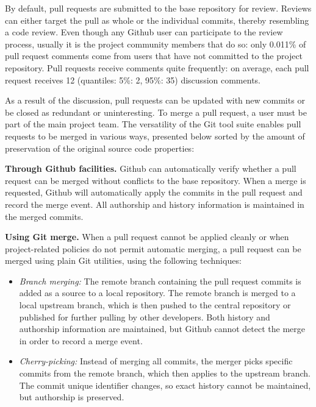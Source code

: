 \documentclass{acm_proc_article-sp}
\begin{document}
By default, pull requests are submitted to the base repository for review.
Reviews can either target the pull as whole or the individual commits,
thereby resembling a code review. 
Even though any Github user can participate to the
review process, usually it is the project community members that do so:
only 0.011\% of pull request comments come from users that have not
committed to the project repository.
Pull requests receive comments quite frequently: on average, each pull
request receives 12 (quantiles: 5\%: 2, 95\%: 35) discussion comments.

As a result of the discussion, pull requests can be updated with new commits or
be closed as redundant or uninteresting. To merge a pull request, a user must
be part of the main project team. The versatility of the Git tool suite enables
pull requests to be merged in various ways, presented below sorted by
the amount of preservation of the original source code properties:


\textbf{Through Github facilities.}
    Github can automatically verify whether a
    pull request can be merged without conflicts to the base repository. When a
    merge is requested, Github will automatically apply the commits in the pull
    request and record the merge event. All authorship and history information
    is maintained in the merged commits.

    
    \textbf{Using Git merge.} When a pull request cannot be applied cleanly or when
    project-related policies do not permit automatic merging, a pull request
    can be merged using plain Git utilities, using the following
    techniques: 

    \begin{itemize}

      \item \emph{Branch merging:} The remote branch containing the pull
        request commits is added as a source to a local repository. The remote 
        branch is merged to a local upstream branch, which is then pushed to
        the central repository or published for further pulling by other
        developers. Both history and authorship information are maintained,
        but Github cannot detect the merge in order to record a merge event. 

      \item \emph{Cherry-picking:} Instead of merging all commits, the merger
        picks specific commits from the remote branch, which then applies to the
        upstream branch. The commit unique identifier changes, so exact history
        cannot be maintained, but authorship is preserved.
    
    \end{itemize}
\end{document}
